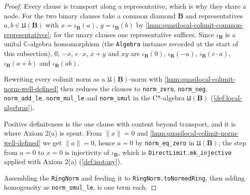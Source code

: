 \begin{proof}
    \leanok
    Every clause is transport along a representative, which is why they share a node. For the two binary clauses take a common diamond $\mathbf{B}$ and representatives $a, b \in \mathfrak{U}(\mathbf{B})$ with $x = \iota_{\mathbf{B}}(a)$, $y = \iota_{\mathbf{B}}(b)$ by \ref{lmm:quasilocal-colimit-common-representatives}; for the unary clauses one representative suffices. Since $\iota_{\mathbf{B}}$ is a unital $\mathbb{C}$-algebra homomorphism (the \texttt{Algebra} instance recorded at the start of this subsection), $0$, $-x$, $c \cdot x$, $x + y$ and $xy$ are $\iota_{\mathbf{B}}(0)$, $\iota_{\mathbf{B}}(-a)$, $\iota_{\mathbf{B}}(c \cdot a)$, $\iota_{\mathbf{B}}(a+b)$ and $\iota_{\mathbf{B}}(ab)$.

    Rewriting every colimit norm as a $\mathfrak{U}(\mathbf{B})$-norm with \ref{lmm:quasilocal-colimit-norm-well-defined} then reduces the clauses to \texttt{norm\_zero}, \texttt{norm\_neg}, \texttt{norm\_add\_le}, \texttt{norm\_mul\_le} and \texttt{norm\_smul} in the C*-algebra $\mathfrak{U}(\mathbf{B})$ (\ref{def:local-algebras}).

    Positive definiteness is the one clause with content beyond transport, and it is where Axiom 2(a) is spent. From $\|x\| = 0$ and \ref{lmm:quasilocal-colimit-norm-well-defined} we get $\|a\| = 0$, hence $a = 0$ by \texttt{norm\_eq\_zero} in $\mathfrak{U}(\mathbf{B})$; the step from $a = 0$ to $x = 0$ is injectivity of $\iota_{\mathbf{B}}$, which is \texttt{DirectLimit.mk\_injective} applied with Axiom 2(a) (\ref{def:isotony}).

    Assembling the \texttt{RingNorm} and feeding it to \texttt{RingNorm.toNormedRing}, then adding homogeneity as \texttt{norm\_smul\_le}, is one term each.
\end{proof}

